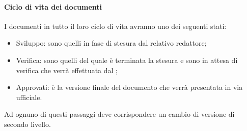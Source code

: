 \documentclass[../NormeDiProgetto_v3.0.0.tex]{subfiles}
\begin{document}
			\paragraph{Ciclo di vita dei documenti}
				I documenti in tutto il loro ciclo di vita avranno uno dei seguenti stati:
				\begin{itemize}
				\item Sviluppo: sono quelli in fase di stesura dal relativo redattore;
				\item Verifica: sono quelli del quale è terminata la stesura e sono in attesa di verifica che verrà effettuata dal \responsabilediprogetto;
				\item Approvati: è la versione finale del documento che verrà presentata in via ufficiale.
				\end{itemize}
				Ad ognuno di questi passaggi deve corrispondere un cambio di versione di secondo livello.
\end{document}

